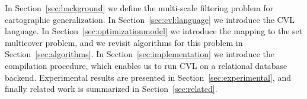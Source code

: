 In Section~\ref{sec:background} we define the multi-scale filtering problem for cartographic generalization. In Section~\ref{sec:cvl:language} we introduce the CVL language. In Section~\ref{sec:optimizationmodel} we introduce the mapping to the set multicover problem, and we revisit algorithms for this problem in Section~\ref{sec:algorithms}. In Section~\ref{sec:implementation} we introduce the compilation procedure, which enables us to run CVL on a relational database backend. Experimental results are presented in Section~\ref{sec:experimental}, and finally related work is summarized in Section~\ref{sec:related}.

